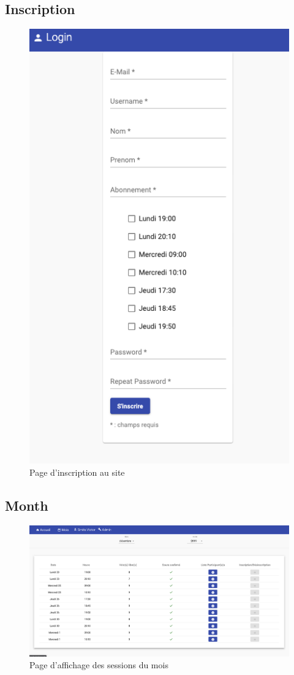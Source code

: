 	\subsection{Inscription}
		\begin{figure}[!htbp]
       	 	\includegraphics[width=0.5\linewidth, center]{Mockup/Inscription.png}
       	 	\caption{Page d'inscription au site}
       	\end{figure}
    
       
       
	\newpage
	\subsection{Month}
		\begin{figure}[h!]
       	 	\includegraphics[width=0.8\linewidth, center]{Mockup/Month.png}
       	 	\caption{Page d'affichage des sessions du mois}
       	\end{figure}
       	

